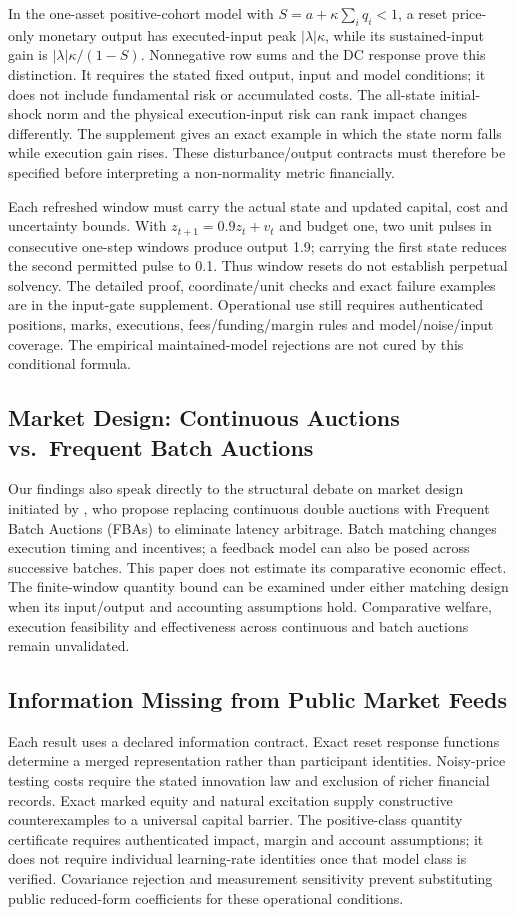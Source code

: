 \documentclass[12pt]{article}
\theoremstyle{definition}
\theoremstyle{remark}
\begin{document}
In the one-asset positive-cohort model with $S=a+\kappa\sum_iq_i<1$, a reset price-only monetary output has executed-input peak $|\lambda|\kappa$, while its sustained-input gain is $|\lambda|\kappa/(1-S)$. Nonnegative row sums and the DC response prove this distinction. It requires the stated fixed output, input and model conditions; it does not include fundamental risk or accumulated costs. The all-state initial-shock norm and the physical execution-input risk can rank impact changes differently. The supplement gives an exact example in which the state norm falls while execution gain rises. These disturbance/output contracts must therefore be specified before interpreting a non-normality metric financially.

Each refreshed window must carry the actual state and updated capital, cost and uncertainty bounds. With $z_{t+1}=0.9z_t+v_t$ and budget one, two unit pulses in consecutive one-step windows produce output 1.9; carrying the first state reduces the second permitted pulse to 0.1. Thus window resets do not establish perpetual solvency. The detailed proof, coordinate/unit checks and exact failure examples are in the input-gate supplement. Operational use still requires authenticated positions, marks, executions, fees/funding/margin rules and model/noise/input coverage. The empirical maintained-model rejections are not cured by this conditional formula.

\subsection{Market Design: Continuous Auctions vs.\ Frequent Batch Auctions}
Our findings also speak directly to the structural debate on market design initiated by \citet{budish2015}, who propose replacing continuous double auctions with Frequent Batch Auctions (FBAs) to eliminate latency arbitrage. Batch matching changes execution timing and incentives; a feedback model can also be posed across successive batches. This paper does not estimate its comparative economic effect. The finite-window quantity bound can be examined under either matching design when its input/output and accounting assumptions hold. Comparative welfare, execution feasibility and effectiveness across continuous and batch auctions remain unvalidated.

\subsection{Information Missing from Public Market Feeds}
\label{sec:missing_info}
Each result uses a declared information contract. Exact reset response functions determine a merged representation rather than participant identities. Noisy-price testing costs require the stated innovation law and exclusion of richer financial records. Exact marked equity and natural excitation supply constructive counterexamples to a universal capital barrier. The positive-class quantity certificate requires authenticated impact, margin and account assumptions; it does not require individual learning-rate identities once that model class is verified. Covariance rejection and measurement sensitivity prevent substituting public reduced-form coefficients for these operational conditions.
\end{document}
